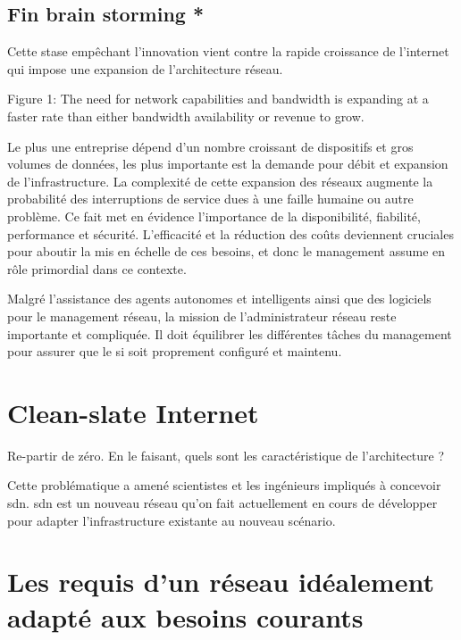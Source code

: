 \subsection*{Fin brain storming *}

Cette stase empêchant l'innovation vient contre la rapide croissance de l'internet qui impose une expansion de l'architecture réseau. 

Figure 1: The need for network capabilities and bandwidth is expanding at a faster rate than either bandwidth availability or revenue to grow.

Le plus une entreprise dépend d'un nombre croissant de dispositifs et gros volumes de données, les plus importante est la demande pour débit et expansion de l'infrastructure. La complexité de cette expansion des réseaux augmente la probabilité des interruptions de service dues à une faille humaine ou autre problème. Ce fait met en évidence l'importance de la disponibilité, fiabilité, performance et sécurité. L'efficacité et la réduction des coûts deviennent cruciales pour aboutir la mis en échelle de ces besoins, et donc le management assume en rôle primordial dans ce contexte. \cite{IBMManagingGrowingPainsNeed}
 

Malgré l'assistance des agents autonomes et intelligents ainsi que des logiciels pour le management réseau, la mission de l'administrateur réseau reste importante et compliquée. Il doit équilibrer les différentes tâches du management pour assurer que le \gls{si} soit proprement configuré et maintenu. \cite{CentralIssuesNetworkManagementConclusion}



\section{Clean-slate Internet}

Re-partir de zéro. En le faisant, quels sont les caractéristique de l'architecture ?


Cette problématique a amené scientistes et les ingénieurs impliqués à concevoir \gls{sdn}. \gls{sdn} est un nouveau  réseau qu'on fait actuellement en cours de développer pour adapter l'infrastructure existante au nouveau scénario.

\section{Les requis d'un réseau idéalement adapté aux besoins courants}